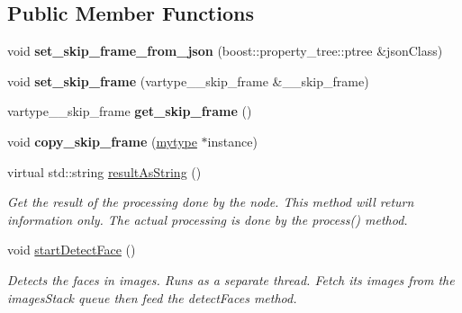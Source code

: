 \subsection*{Public Member Functions}
\begin{DoxyCompactItemize}
\item 
\mbox{\label{classfilter_1_1algos_1_1_face_detection_af5bc7f40acdc92a682aab460105fba40}} 
void {\bfseries set\+\_\+skip\+\_\+frame\+\_\+from\+\_\+json} (boost\+::property\+\_\+tree\+::ptree \&json\+Class)
\item 
\mbox{\label{classfilter_1_1algos_1_1_face_detection_a98e8525066ace3ed911198993317c97e}} 
void {\bfseries set\+\_\+skip\+\_\+frame} (vartype\+\_\+\+\_\+skip\+\_\+frame \&\+\_\+\+\_\+skip\+\_\+frame)
\item 
\mbox{\label{classfilter_1_1algos_1_1_face_detection_a9075cc8278dcf172d30549966e69c48b}} 
vartype\+\_\+\+\_\+skip\+\_\+frame {\bfseries get\+\_\+skip\+\_\+frame} ()
\item 
\mbox{\label{classfilter_1_1algos_1_1_face_detection_a27701697a39da6e752a78ae055ab058d}} 
void {\bfseries copy\+\_\+skip\+\_\+frame} (\hyperlink{classfilter_1_1algos_1_1_face_detection}{mytype} $\ast$instance)
\item 
virtual std\+::string \hyperlink{classfilter_1_1algos_1_1_face_detection_a11c5004107d5048de93ae81ced065a26}{result\+As\+String} ()
\begin{DoxyCompactList}\small\item\em Get the result of the processing done by the node. This method will return information only. The actual processing is done by the process() method. \end{DoxyCompactList}\item 
\mbox{\label{classfilter_1_1algos_1_1_face_detection_a4fb67105560c0886b405912cd4cedb31}} 
void \hyperlink{classfilter_1_1algos_1_1_face_detection_a4fb67105560c0886b405912cd4cedb31}{start\+Detect\+Face} ()
\begin{DoxyCompactList}\small\item\em Detects the faces in images. Runs as a separate thread. Fetch its images from the images\+Stack queue then feed the detect\+Faces method. \end{DoxyCompactList}\item 

\end{DoxyCompactItemize}
